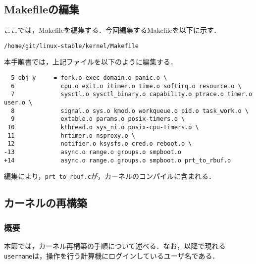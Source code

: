 \documentclass[12pt]{jsarticle}
\begin{document}
\subsection{Makefileの編集}
ここでは，Makefileを編集する．今回編集するMakefileを以下に示す．
\begin{verbatim}
/home/git/linux-stable/kernel/Makefile
\end{verbatim}
本手順書では，上記ファイルを以下のように編集する．
\begin{verbatim}
  5 obj-y     = fork.o exec_domain.o panic.o \
  6             cpu.o exit.o itimer.o time.o softirq.o resource.o \
  7             sysctl.o sysctl_binary.o capability.o ptrace.o timer.o user.o \
  8             signal.o sys.o kmod.o workqueue.o pid.o task_work.o \
  9             extable.o params.o posix-timers.o \
 10             kthread.o sys_ni.o posix-cpu-timers.o \
 11             hrtimer.o nsproxy.o \
 12             notifier.o ksysfs.o cred.o reboot.o \
-13             async.o range.o groups.o smpboot.o
+14             async.o range.o groups.o smpboot.o prt_to_rbuf.o
\end{verbatim}
編集により，\verb|prt_to_rbuf.c|が，カーネルのコンパイルに含まれる．
\subsection{カーネルの再構築}

\subsubsection{概要}
本節では，カーネル再構築の手順について述べる．なお，以降で現れる\verb|username|は，操作を行う計算機にログインしているユーザ名である．
\end{document}
